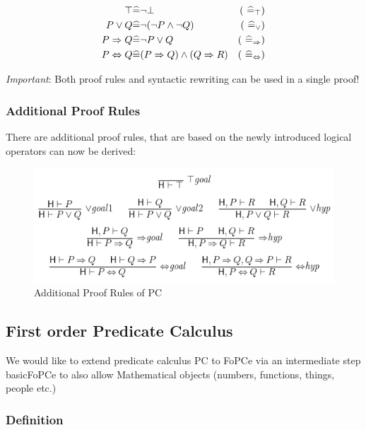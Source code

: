 \begin{align*}
	\top & \widehat{=} \neg \bot 
	& \text{( $\widehat{=}_{\top}$)} \\
	P \lor Q & \widehat{=} \neg(\neg P \land \neg Q)
	& \text{( $\widehat{=}_{\lor}$)} \\
	P \Rightarrow Q & \widehat{=} \neg P \lor Q
	& \text{( $\widehat{=}_{\Rightarrow}$)} \\
	P \Leftrightarrow Q & \widehat{=} (P\Rightarrow Q) \land (Q \Rightarrow R)
	& \text{( $\widehat{=}_{\Leftrightarrow}$)} \\
\end{align*}

\emph{Important}: Both proof rules and syntactic rewriting can be used in a single proof!

\subsubsection{Additional Proof Rules}

There are additional proof rules, that are based on the newly introduced logical operators can now be derived:

\begin{figure}[h]
\centering
\includegraphics[width=0.7\linewidth]{images/pc_additional_proof_rules}
\caption{Additional Proof Rules of PC}
\label{fig:pcadditionalproofrules}
\end{figure}



\subsection{First order Predicate Calculus}

We would like to extend predicate calculus PC to FoPCe via an intermediate step basicFoPCe to also allow Mathematical objects (numbers, functions, things, people etc.)

\subsubsection{Definition}

